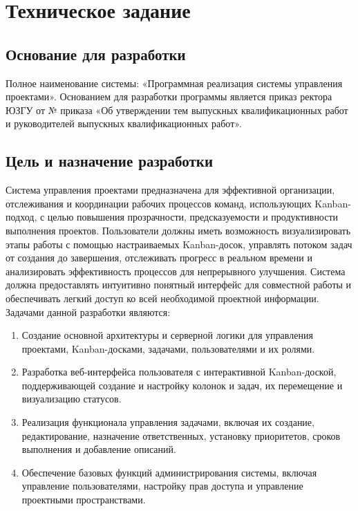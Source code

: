 \section{Техническое задание}
\subsection{Основание для разработки}

Полное наименование системы: «Программная реализация системы управления проектами». Основанием для разработки программы является приказ ректора ЮЗГУ от  №  приказа «Об утверждении тем выпускных квалификационных работ и руководителей выпускных квалификационных работ».

\subsection{Цель и назначение разработки}

Система управления проектами предназначена для эффективной организации, отслеживания и координации рабочих процессов команд, использующих Kanban-подход, с целью повышения прозрачности, предсказуемости и продуктивности выполнения проектов.
Пользователи должны иметь возможность визуализировать этапы работы с помощью настраиваемых Kanban-досок, управлять потоком задач от создания до завершения, отслеживать прогресс в реальном времени и анализировать эффективность процессов для непрерывного улучшения. Система должна предоставлять интуитивно понятный интерфейс для совместной работы и обеспечивать легкий доступ ко всей необходимой проектной информации.
Задачами данной разработки являются:
\begin{enumerate}
	\item Создание основной архитектуры и серверной логики для управления проектами, Kanban-досками, задачами, пользователями и их ролями.
	\item Разработка веб-интерфейса пользователя с интерактивной Kanban-доской, поддерживающей создание и настройку колонок и задач, их перемещение и визуализацию статусов.
	\item Реализация функционала управления задачами, включая их создание, редактирование, назначение ответственных, установку приоритетов, сроков выполнения и добавление описаний.
	\item Обеспечение базовых функций администрирования системы, включая управление пользователями, настройку прав доступа и управление проектными пространствами.
\end{enumerate}


